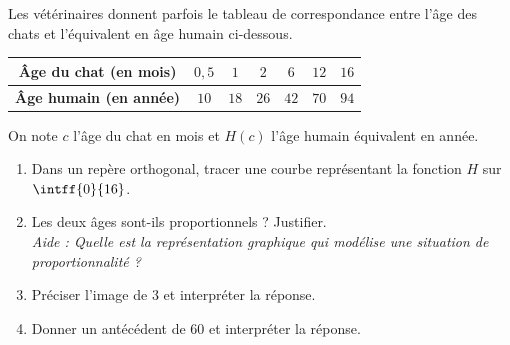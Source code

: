 \begin{exo}{}
	Les vétérinaires donnent parfois le tableau de correspondance entre l'âge des chats et l'équivalent en âge humain ci-dessous.


	\begin{center}
		\renewcommand{\arraystretch}{1.5}
		\begin{tabular}{|c|c|c|c|c|c|c|} \hline
			\cellcolor{gray!30}\footnotesize\textbf{Âge du chat (en mois)} & $0,5$ & $1$  & $2$  & $6$  & $12$ & $16$ \\ \hline
			\cellcolor{gray!30}\footnotesize\textbf{Âge humain (en année)} & $10$  & $18$ & $26$ & $42$ & $70$ & $94$ \\ \hline
		\end{tabular}
	\end{center}


	On note $c$ l'âge du chat en mois et $H(c)$ l'âge humain équivalent en année.

	\begin{enumerate}
		\item Dans un repère orthogonal, tracer une courbe représentant la fonction $H$ sur $\intff{0}{16}$.
		\item Les deux âges sont-ils proportionnels ? Justifier.\\
		      \textit{\emph{Aide :} Quelle est la représentation graphique qui modélise une situation de proportionnalité ?}
		\item Préciser l'image de $3$ et interpréter la réponse.
		\item Donner un antécédent de $60$ et interpréter la réponse.
	\end{enumerate}
\end{exo}
